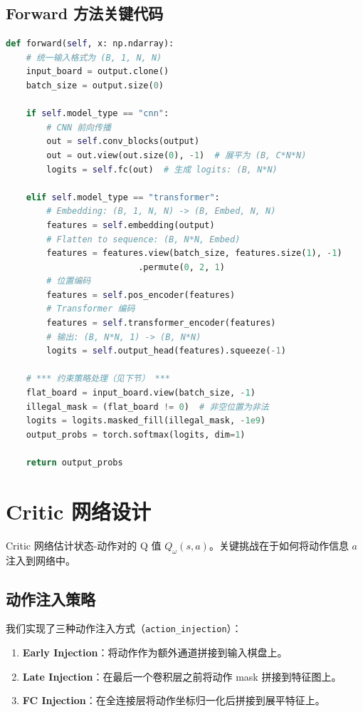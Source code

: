 \documentclass[oneside]{ctexbook}
\begin{document}
\subsection{Forward 方法关键代码}

\begin{lstlisting}[language=Python]
def forward(self, x: np.ndarray):
    # 统一输入格式为 (B, 1, N, N)
    input_board = output.clone()
    batch_size = output.size(0)
    
    if self.model_type == "cnn":
        # CNN 前向传播
        out = self.conv_blocks(output)
        out = out.view(out.size(0), -1)  # 展平为 (B, C*N*N)
        logits = self.fc(out)  # 生成 logits: (B, N*N)
    
    elif self.model_type == "transformer":
        # Embedding: (B, 1, N, N) -> (B, Embed, N, N)
        features = self.embedding(output)
        # Flatten to sequence: (B, N*N, Embed)
        features = features.view(batch_size, features.size(1), -1)
                          .permute(0, 2, 1)
        # 位置编码
        features = self.pos_encoder(features)
        # Transformer 编码
        features = self.transformer_encoder(features)
        # 输出: (B, N*N, 1) -> (B, N*N)
        logits = self.output_head(features).squeeze(-1)
    
    # *** 约束策略处理（见下节） ***
    flat_board = input_board.view(batch_size, -1)
    illegal_mask = (flat_board != 0)  # 非空位置为非法
    logits = logits.masked_fill(illegal_mask, -1e9)
    output_probs = torch.softmax(logits, dim=1)
    
    return output_probs
\end{lstlisting}

\section{Critic 网络设计}

Critic 网络估计状态-动作对的 Q 值 $Q_\omega(s, a)$。关键挑战在于如何将动作信息 $a$ 注入到网络中。

\subsection{动作注入策略}

我们实现了三种动作注入方式（\texttt{action\_injection}）：

\begin{enumerate}
    \item \textbf{Early Injection}：将动作作为额外通道拼接到输入棋盘上。
    \item \textbf{Late Injection}：在最后一个卷积层之前将动作 mask 拼接到特征图上。
    \item \textbf{FC Injection}：在全连接层将动作坐标归一化后拼接到展平特征上。
\end{enumerate}
\end{document}
